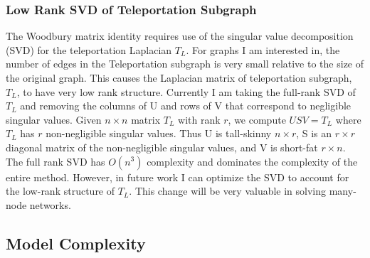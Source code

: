 \documentclass{article}
\begin{document}
\subsubsection{Low Rank SVD of Teleportation Subgraph}
The Woodbury matrix identity requires use of the singular value decomposition (SVD) for the teleportation Laplacian $T_L$. For graphs I am interested in, the number of edges in the Teleportation subgraph is very small relative to the size of the original graph. This causes the Laplacian matrix of teleportation subgraph, $T_L$, to have very low rank structure. Currently I am taking the full-rank SVD of $T_L$ and removing the columns of U and rows of V that correspond to negligible singular values. Given $n\times n$ matrix $T_L$ with rank $r$, we compute $USV = T_L$ where $T_L$ has $r$ non-negligible singular values. Thus U is tall-skinny $n\times r$, S is an $r\times r$ diagonal matrix of the non-negligible singular values, and V is short-fat $r\times n$. The full rank SVD has $O(n^3)$ complexity and dominates the complexity of the entire method. However, in future work I can optimize the SVD to account for the low-rank structure of $T_L$. This change will be very valuable in solving many-node networks.

\subsection{Model Complexity}
\end{document}
